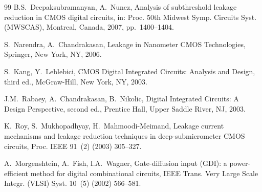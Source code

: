 \documentclass[final,5p,times,twocolumn]{elsarticle}
\begin{document}
\begin{thebibliography}{99}
B.S.~Deepaksubramanyan, A.~Nunez, Analysis of subthreshold leakage reduction in CMOS digital circuits, in: Proc. 50th Midwest Symp. Circuits Syst. (MWSCAS), Montreal, Canada, 2007, pp.~1400--1404.

S.~Narendra, A.~Chandrakasan, Leakage in Nanometer CMOS Technologies, Springer, New York, NY, 2006.

S.~Kang, Y.~Leblebici, CMOS Digital Integrated Circuits: Analysis and Design, third ed., McGraw-Hill, New York, NY, 2003.

J.M.~Rabaey, A.~Chandrakasan, B.~Nikolic, Digital Integrated Circuits: A Design Perspective, second ed., Prentice Hall, Upper Saddle River, NJ, 2003.

K.~Roy, S.~Mukhopadhyay, H.~Mahmoodi-Meimand, Leakage current mechanisms and leakage reduction techniques in deep-submicrometer CMOS circuits, Proc. IEEE 91~(2) (2003) 305--327.

A.~Morgenshtein, A.~Fish, I.A.~Wagner, Gate-diffusion input (GDI): a power-efficient method for digital combinational circuits, IEEE Trans. Very Large Scale Integr. (VLSI) Syst. 10~(5) (2002) 566--581.

\end{thebibliography}
\end{document}
